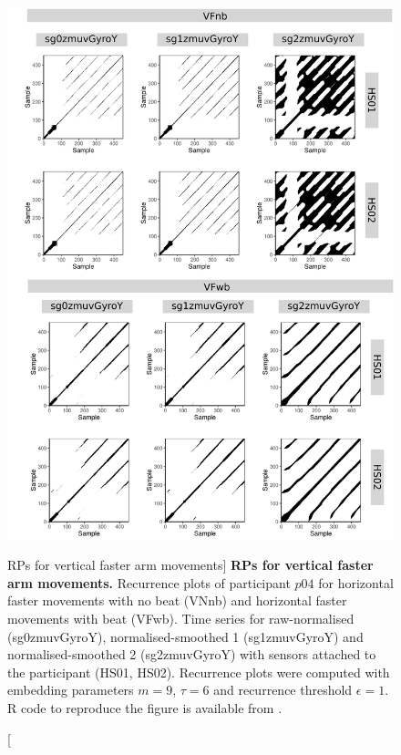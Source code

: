 \begin{figure}
\centering
\includegraphics[height=0.8\textheight]{rps_VF_w500_p04}
\caption
	[RPs for vertical faster arm movements]{
	{\bf RPs for vertical faster arm movements.}	
	Recurrence plots of participant $p04$ for 
	horizontal faster movements with no beat (VNnb) and
	horizontal faster movements with beat (VFwb).
	Time series for raw-normalised (sg0zmuvGyroY), 
	normalised-smoothed 1 (sg1zmuvGyroY) and 
	normalised-smoothed 2 (sg2zmuvGyroY) with
	sensors attached to the participant (HS01, HS02).
	Recurrence plots were computed with 
	embedding parameters $m=9$, $\tau=6$ and 
	recurrence threshold $\epsilon=1$.
	R code to reproduce the figure is available from \cite{xochicale2018}.
        }
    \label{fig:rps_VF_w500_p04}
\end{figure}







